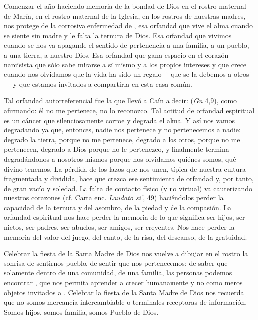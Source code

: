 Comenzar el año haciendo memoria de la bondad de Dios en el rostro maternal de María, en el rostro maternal de la Iglesia, en los rostros de nuestras madres, nos protege de la corrosiva enfermedad de , esa orfandad que vive el alma cuando se siente sin madre y le falta la ternura de Dios. Esa orfandad que vivimos cuando se nos va apagando el sentido de pertenencia a una familia, a un pueblo, a una tierra, a nuestro Dios. Esa orfandad que gana espacio en el corazón narcisista que sólo sabe mirarse a sí mismo y a los propios intereses y que crece cuando nos olvidamos que la vida ha sido un regalo ---que se la debemos a otros--- y que estamos invitados a compartirla en esta casa común.

Tal orfandad autorreferencial fue la que llevó a Caín a decir:  (\emph{Gn} 4,9), como afirmando: él no me pertenece, no lo reconozco. Tal actitud de orfandad espiritual es un cáncer que silenciosamente corroe y degrada el alma. Y así nos vamos degradando ya que, entonces, nadie nos pertenece y no pertenecemos a nadie: degrado la tierra, porque no me pertenece, degrado a los otros, porque no me pertenecen, degrado a Dios porque no le pertenezco, y finalmente termina degradándonos a nosotros mismos porque nos olvidamos quiénes somos, qué  divino tenemos. La pérdida de los lazos que nos unen, típica de nuestra cultura fragmentada y dividida, hace que crezca ese sentimiento de orfandad y, por tanto, de gran vacío y soledad. La falta de contacto físico (y no virtual) va cauterizando nuestros corazones (cf. Carta enc. \emph{Laudato si'}, 49) haciéndolos perder la capacidad de la ternura y del asombro, de la piedad y de la compasión. La orfandad espiritual nos hace perder la memoria de lo que significa ser hijos, ser nietos, ser padres, ser abuelos, ser amigos, ser creyentes. Nos hace perder la memoria del valor del juego, del canto, de la risa, del descanso, de la gratuidad.

Celebrar la fiesta de la Santa Madre de Dios nos vuelve a dibujar en el rostro la sonrisa de sentirnos pueblo, de sentir que nos pertenecemos; de saber que solamente dentro de una comunidad, de una familia, las personas podemos encontrar ,  que nos permita aprender a crecer humanamente y no como meros objetos invitados a . Celebrar la fiesta de la Santa Madre de Dios nos recuerda que no somos mercancía intercambiable o terminales receptoras de información. Somos hijos, somos familia, somos Pueblo de Dios.


